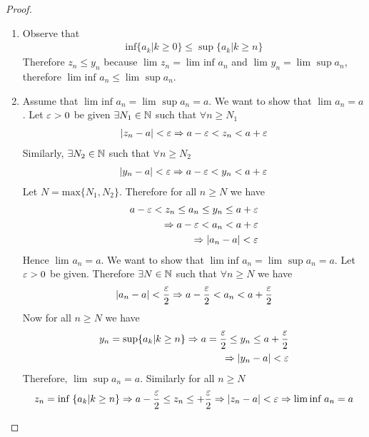 \begin{proof}
	\begin{enumerate}
		\item Observe that 
			\begin{align}
				\text{inf}\{a_k | k \ge 0\} \le \sup \{a_k | k \ge n\} 
			\end{align}
		Therefore $z_n \le y_n$ because $\lim_{} z_n = \lim_{} \text{inf } a_n$ and $\lim_{} y_n = \lim_{} \sup a_n$, therefore $\lim_{} \text{inf } a_n \le \lim_{} \sup a_n$.
		\item Assume that $\lim_{} \text{inf } a_n = \lim_{} \sup a_n = a$. We want to show that $\lim_{} a_n = a$. Let $\e > 0$ be given $\exists N_1 \in \mathbb{N}$ such that $\forall n \ge N_1$
			\begin{align}
				\left|z_n - a\right| < \e \implies a - \e < z_n < a + \e
			\end{align}
		Similarly, $\exists N_2 \in \mathbb{N}$ such that $\forall n \ge N_2$ 
		\begin{align}
			\left|y_n - a\right| < \e \implies a - \e < y_n < a + \e
		\end{align}
		Let $N = \text{max} \{N_1, N_2\} $. Therefore for all $n \ge N$ we have 
		\begin{align}
			a-\e < z_n \le a_n \le y_n \le a + \e \\
			\implies a - \e < a_n < a + \e \\
			\implies \left|a_n - a\right| < \e
		\end{align}
		Hence $\lim_{} a_n = a$. We want to show that $\lim_{} \text{inf } a_n = \lim_{} \sup a_n = a$. Let $\e > 0$ be given. Therefore $\exists N \in \mathbb{N}$ such that $\forall n \ge N$ we have
		\begin{align}
			\left|a_n - a\right| < \frac{\e}{2} \implies a - \frac{\e}{2} < a_n < a + \frac{\e}{2}
		\end{align}
		Now for all $n \ge N$ we have
		\begin{align}
			y_n = \sup \{a_k | k \ge n\} \implies a = \frac{\e}{2} \le y_n \le a + \frac{\e}{2} \\
			\implies \left|y_n - a\right| < \e
		\end{align}
		Therefore, $\lim_{} \sup a_n = a$. Similarly for all $n \ge N$ 
		\begin{align}
			z_n = \text{inf } \{a_k | k \ge n\} \implies a - \frac{\e}{2} \le z_n \le + \frac{\e}{2} \implies \left|z_n - a\right| < \e \implies \lim_{} \text{inf } a_n = a
		\end{align}
	\end{enumerate}
\end{proof}

